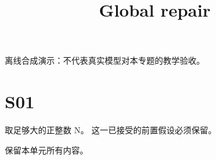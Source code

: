 \documentclass[UTF8,fontset=fandol,11pt]{ctexart}
\title{Global repair}
\date{}
\begin{document}
\maketitle
\par\noindent 离线合成演示：不代表真实模型对本专题的教学验收。\par
\section{S01}\label{sec:S01}
取足够大的正整数 N。 这一已接受的前置假设必须保留。\par
保留本单元所有内容。\par
\end{document}

